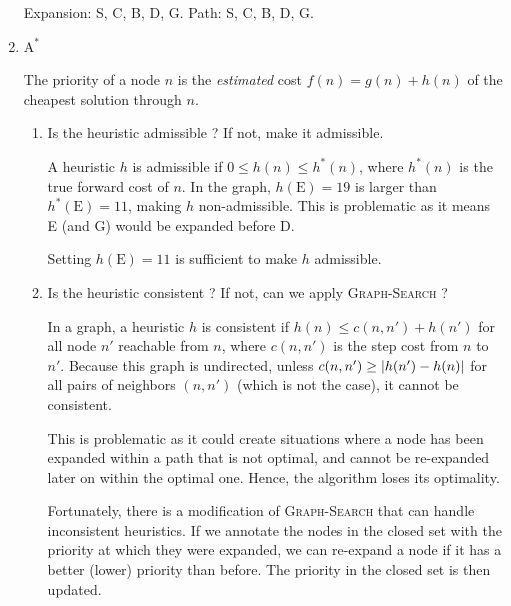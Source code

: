 \documentclass[11pt, a4paper]{article}
\def\Astar{$\text{A}^*$}
\begin{document}
\begin{enumerate}
\begin{solution}
        Expansion: S, C, B, D, G. Path: S, C, B, D, G.
    \end{solution}

    \item \Astar{}

    \begin{solution}
    The priority of a node $n$ is the \emph{estimated} cost $f(n) = g(n) + h(n)$ of the cheapest solution through $n$.
    \end{solution}

    \begin{enumerate}
        \item Is the heuristic admissible ? If not, make it admissible.

        \begin{solution}
            A heuristic $h$ is admissible if $0 \leq h(n) \leq h^*(n)$, where $h^*(n)$ is the true forward cost of $n$. In the graph, $h(\text{E}) = 19$ is larger than $h^*(\text{E}) = 11$, making $h$ non-admissible. This is problematic as it means E (and G) would be expanded before D.

            Setting $h(\text{E}) = 11$ is sufficient to make $h$ admissible.
        \end{solution}

        \item Is the heuristic consistent ? If not, can we apply \textsc{Graph-Search} ?

        \begin{solution}
            In a graph, a heuristic $h$ is consistent if $h(n) \leq c(n, n') + h(n')$ for all node $n'$ reachable from $n$, where $c(n, n')$ is the step cost from $n$ to $n'$. Because this graph is undirected, unless $c(n, n') \geq \lvert h(n') - h(n)\rvert$ for all pairs of neighbors $(n, n')$ (which is not the case), it cannot be consistent.

            This is problematic as it could create situations where a node has been expanded within a path that is not optimal, and cannot be re-expanded later on within the optimal one. Hence, the algorithm loses its optimality.

            Fortunately, there is a modification of \textsc{Graph-Search} that can handle inconsistent heuristics. If we annotate the nodes in the closed set with the priority at which they were expanded, we can re-expand a node if it has a better (lower) priority than before. The priority in the closed set is then updated.
        \end{solution}
    \end{enumerate}


\end{enumerate}
\end{document}

